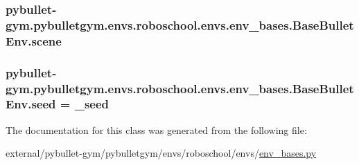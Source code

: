 \subsubsection[{\texorpdfstring{scene}{scene}}]{\setlength{\rightskip}{0pt plus 5cm}pybullet-\/gym.\+pybulletgym.\+envs.\+roboschool.\+envs.\+env\+\_\+bases.\+Base\+Bullet\+Env.\+scene}\hypertarget{classpybullet-gym_1_1pybulletgym_1_1envs_1_1roboschool_1_1envs_1_1env__bases_1_1_base_bullet_env_aafffb743d31a1abef217375923fb7f0a}{}\label{classpybullet-gym_1_1pybulletgym_1_1envs_1_1roboschool_1_1envs_1_1env__bases_1_1_base_bullet_env_aafffb743d31a1abef217375923fb7f0a}
\subsubsection[{\texorpdfstring{seed}{seed}}]{\setlength{\rightskip}{0pt plus 5cm}pybullet-\/gym.\+pybulletgym.\+envs.\+roboschool.\+envs.\+env\+\_\+bases.\+Base\+Bullet\+Env.\+seed = \+\_\+seed\hspace{0.3cm}{\ttfamily [static]}}\hypertarget{classpybullet-gym_1_1pybulletgym_1_1envs_1_1roboschool_1_1envs_1_1env__bases_1_1_base_bullet_env_a66b7fb827d1f69094fa63c288ac8924c}{}\label{classpybullet-gym_1_1pybulletgym_1_1envs_1_1roboschool_1_1envs_1_1env__bases_1_1_base_bullet_env_a66b7fb827d1f69094fa63c288ac8924c}


The documentation for this class was generated from the following file\+:\begin{DoxyCompactItemize}
\item 
external/pybullet-\/gym/pybulletgym/envs/roboschool/envs/\hyperlink{roboschool_2envs_2env__bases_8py}{env\+\_\+bases.\+py}\end{DoxyCompactItemize}
